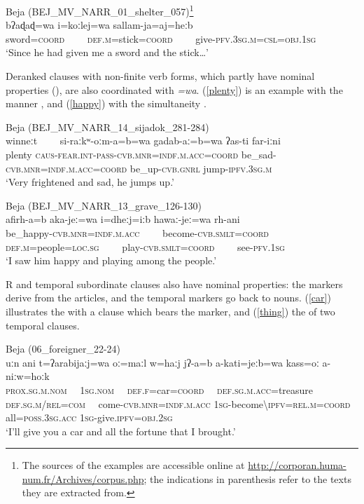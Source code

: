 \documentclass[output=paper]{langsci/langscibook}
\begin{document}
\ea \label{sword}
{Beja (BEJ\_MV\_NARR\_01\_shelter\_057)\footnote{The sources of the examples are accessible online at \url{http://corporan.huma-num.fr/Archives/corpus.php}; the indications in parenthesis refer to the texts they are extracted from.}}\\
\gll bʔaɖaɖ=wa i=koːlej=wa sallam-ja=aj=heːb\\
     sword=\textsc{coord}~~~~ \textsc{def.m}=stick=\textsc{coord}~~~~ give-\textsc{pfv.3sg.m=csl=obj.1sg}\\
\glt `Since he had given me a sword and the stick…'
\z

Deranked clauses with non-finite verb forms, which partly have nominal properties (\citealt{Vanhove2016}), are also coordinated with \textit{=wa}. (\ref{plenty}) is an example with the manner , and (\ref{happy}) with the simultaneity . 

\ea\label{plenty}
{Beja (BEJ\_MV\_NARR\_14\_sijadok\_281-284)}\\
\gll winneːt~~~~ si-raːkʷ-oːm-a=b=wa gadab-aː=b=wa  ʔas-ti far-iːni\\
     plenty \textsc{caus}{}-\textsc{\textup{fear}}.\textsc{int-pass-cvb.mnr=indf.m.acc=coord} be\_sad-\textsc{cvb.mnr=indf.m.acc=coord} be\_up-\textsc{cvb.gnrl} jump-\textsc{ipfv.3sg.m}\\
\glt `Very frightened and sad, he jumps up.'
\z

\ea\label{happy}
{Beja (BEJ\_MV\_NARR\_13\_grave\_126-130)}\\
\gll afirh-a=b aka-jeː=wa i=dheːj=iːb hawaː-jeː=wa rh-ani\\
     be\_happy-\textsc{cvb.mnr=indf.m.acc}~~~~ become-\textsc{cvb.smlt=coord} \textsc{def.m}=people=\textsc{loc.sg}~~~~ play-\textsc{cvb.smlt=coord}~~~~ see-\textsc{pfv.1sg}\\
\glt `I saw him happy and playing among the people.'
\z

{R and temporal subordinate clauses also have nominal properties: the  markers derive from the articles, and the temporal markers go back to nouns. (\ref{car}) illustrates the  with a  clause which bears the} { marker, and (\ref{thing}) the  of two temporal clauses.}

\ea\label{car}
{{Beja}{ (}{06\_foreigner\_22-24)}}\\
\gll uːn ani t=ʔarabijaːj=wa oː=maːl w=haːj jʔ-a=b a-kati=jeːb=wa kass=oː  a-niːw=hoːk\\
     \textsc{prox.sg.m.nom}~~	\textsc{1sg.nom}~~ \textsc{def.f=}car=\textsc{coord}~~ \textsc{def.sg.m.acc=}treasure \textsc{def.sg.m/rel=com}~~ come-\textsc{cvb.mnr=indf.m.acc} \textsc{1sg}-become\textsc{\textbackslash ipfv=rel.m=coord} all=\textsc{poss.3sg.acc} \textsc{1sg}-give.\textsc{ipfv=obj.2sg}\\
\glt `I’ll give you a car and all the fortune that I brought.'
\z
\end{document}
